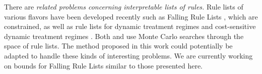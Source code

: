 \documentclass[aoas,preprint]{imsart}
\begin{document}
There are \textit{related problems concerning interpretable lists of rules.}
Rule lists of various flavors have been developed recently such as Falling Rule Lists \cite{WangRu}, which are constrained, as well as rule lists for dynamic treatment regimes \cite{ZhangEtAl15} and cost-sensitive dynamic treatment regimes \cite{LakkarajuRu17}. Both \cite{WangRu} and \cite{LakkarajuRu17} use Monte Carlo searches through the space of rule lists. The method proposed in this work could potentially be adapted to handle these kinds of interesting problems. We are currently working on bounds for Falling Rule Lists \cite{ChenRu17} similar to those presented here. 









\end{document}
